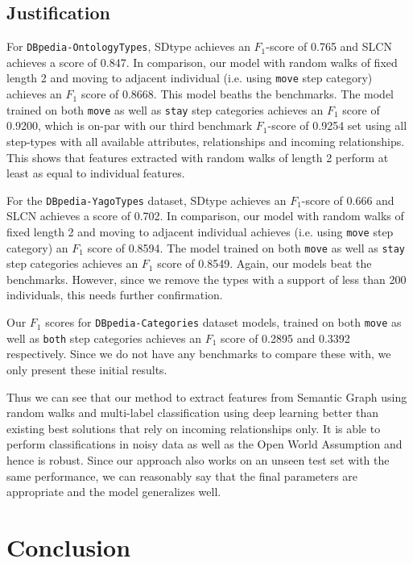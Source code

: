 \documentclass[runningheads,a4paper]{IEEEtran}
\begin{document}
\subsection{Justification}
For \texttt{DBpedia-OntologyTypes}, SDtype achieves an $F_1$-score of  0.765 and SLCN\cite{melo2016type} achieves a score of 0.847. In comparison, our model with random walks of fixed length 2 and moving to adjacent individual (i.e. using \texttt{move} step category) achieves an $F_1$ score of 0.8668. This model beaths the benchmarks. The model trained on both \texttt{move} as well as \texttt{stay} step categories achieves an $F_1$ score of 0.9200, which is on-par with our third benchmark $F_1$-score of 0.9254 set using all step-types with all available attributes, relationships and incoming relationships. This shows that features extracted with random walks of length 2 perform at least as equal to individual features. 

For the \texttt{DBpedia-YagoTypes} dataset, SDtype achieves an $F_1$-score of 0.666 and SLCN\cite{melo2016type} achieves a score of 0.702. In comparison, our model with random walks of fixed length 2 and moving to adjacent individual achieves (i.e. using \texttt{move} step category) an $F_1$ score of 0.8594. The model trained on both \texttt{move} as well as \texttt{stay} step categories achieves an $F_1$ score of 0.8549. Again, our models beat the benchmarks. However, since we remove the types with a support of less than 200 individuals, this needs further confirmation.

Our $F_1$ scores for \texttt{DBpedia-Categories} dataset models, trained on both \texttt{move} as well as \texttt{both} step categories achieves an $F_1$ score of 0.2895 and 0.3392 respectively. Since we do not have any benchmarks to compare these with, we only present these initial results.

Thus we can see that our method to extract features from Semantic Graph using  random walks and multi-label classification using deep learning better than existing best solutions that rely on incoming relationships only. It is able to perform classifications in noisy data as well as the Open World Assumption and hence is robust. Since our approach also works on an unseen test set with the same performance, we can reasonably say that the final parameters are appropriate and the model generalizes well. 


\section{Conclusion}
\end{document}
